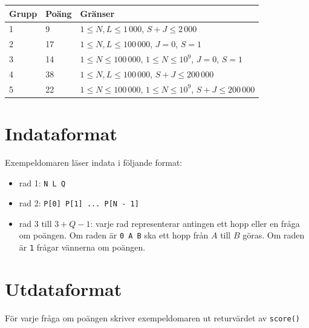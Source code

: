 \begin{tabular}{|l|l|l|}
  \hline
  \textbf{Grupp} & \textbf{Poäng} & \textbf{Gränser} \\ \hline
  1 & 9 & $1 \le N, L \le 1\,000$,  $S + J \le 2\,000$ \\ \hline
  2 & 17 & $1 \le N, L \le 100\,000$, $J = 0$, $S = 1$ \\ \hline
  3 & 14 & $1 \le N \le 100\,000$, $1 \le N \le 10^9$, $J = 0$, $S = 1$ \\ \hline
  4 & 38 & $1 \le N, L \le 100\,000$, $S + J \le 200\,000$ \\ \hline
  5 & 22 & $1 \le N \le 100\,000$, $1 \le N \le 10^9$, $S + J \le 200\,000$ \\ \hline
\end{tabular}

\section*{Indataformat}
Exempeldomaren läser indata i följande format:

\begin{itemize}
  \item rad 1: \texttt{N L Q}
  \item rad 2: \texttt{P[0] P[1] ... P[N - 1]}
  \item rad $3$ till $3 + Q - 1$: varje rad representerar antingen ett hopp eller en fråga om poängen.
    Om raden är \texttt{0 A B} ska ett hopp från $A$ till $B$ göras. Om raden är \texttt{1} frågar vännerna om poängen.
\end{itemize}

\section*{Utdataformat}
För varje fråga om poängen skriver exempeldomaren ut returvärdet av \texttt{score()}
